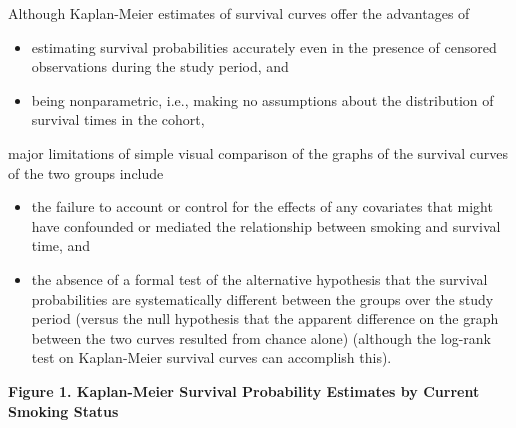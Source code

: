 \documentclass{article}\usepackage[]{graphicx}\usepackage[]{color}
\begin{document}
\vspace{2mm}

Although Kaplan-Meier estimates of survival curves offer the advantages of 
\begin{itemize}
  \item estimating survival probabilities accurately even in the presence of censored observations during the study period, and
  \item being nonparametric, i.e., making no assumptions about the distribution of survival times in the cohort,
\end{itemize}

major limitations of simple visual comparison of the graphs of the survival curves of the two groups include 

\begin{itemize}
  \item the failure to account or control for the effects of any covariates that might have confounded or mediated the relationship between smoking and survival time, and
  \item the absence of a formal test of the alternative hypothesis that the survival probabilities are systematically different between the groups over the study period (versus the null hypothesis that the apparent difference on the graph between the two curves resulted from chance alone) (although the log-rank test on Kaplan-Meier survival curves can accomplish this).
  
\end{itemize}

\pagebreak

\begin{center}

\textbf{Figure 1. Kaplan-Meier Survival Probability Estimates by Current Smoking Status}

\end{center}
\end{document}
